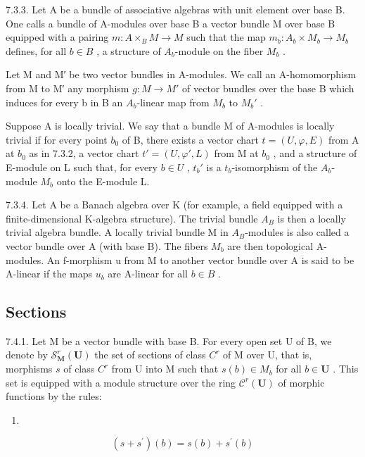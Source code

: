 7.3.3. Let A be a bundle of associative algebras with unit element over base B. One calls a bundle of A-modules over base B a vector bundle M over base B equipped with a pairing \(m: A \times_{B} M \to M\) such that the map \(m_{b}: A_{b} \times M_{b} \to M_{b}\) defines, for all \(b \in B\) , a structure of \(A_{b}\)-module on the fiber \(M_{b}\) .

Let M and M′ be two vector bundles in A-modules. We call an A-homomorphism from M to M′ any morphism \(g: M \rightarrow M'\) of vector bundles over the base B which induces for every b in B an \(A_b\)-linear map from \(M_b\) to \(M_b'\) .

Suppose A is locally trivial. We say that a bundle M of A-modules is locally trivial if for every point \(b_0\) of B, there exists a vector chart \(t = (U, \varphi, E)\) from A at \(b_0\) as in 7.3.2, a vector chart \(t' = (U, \varphi', L)\) from M at \(b_0\) , and a structure of E-module on L such that, for every \(b \in U\) , \(t_b'\) is a \(t_b\)-isomorphism of the \(A_b\)-module \(M_b\) onto the E-module L.

7.3.4. Let A be a Banach algebra over K (for example, a field equipped with a finite-dimensional K-algebra structure). The trivial bundle \(A_{B}\) is then a locally trivial algebra bundle. A locally trivial bundle M in \(A_{B}\)-modules is also called a vector bundle over A (with base B). The fibers \(M_{b}\) are then topological A-modules. An f-morphism u from M to another vector bundle over A is said to be A-linear if the maps \(u_{b}\) are A-linear for all \(b \in B\) .

\subsection{Sections}

7.4.1. Let M be a vector bundle with base B. For every open set U of B, we denote by \(\mathcal{S}_{\mathbf{M}}^{r}(\mathbf{U})\) the set of sections of class \(C^r\) of M over U, that is, morphisms \(s\) of class \(C^r\) from U into M such that \(s(b) \in M_b\) for all \(b \in \mathbf{U}\) . This set is equipped with a module structure over the ring \(\mathcal{C}^r(\mathbf{U})\) of morphic functions by the rules:

\begin{enumerate}
\def\labelenumi{(\arabic{enumi})}
\tightlist
\item
\end{enumerate}

\[
(s + s ^ {\prime}) (b) = s (b) + s ^ {\prime} (b)\tag{2}
\]

